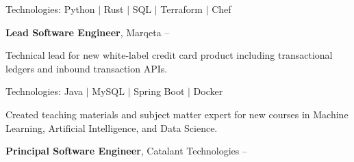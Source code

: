 \documentclass[MMMMyyyy,nonstopmode]{simpleresumecv_stacked}
\newcommand{\tech}[1]{\Gap\textrm{Technologies:} #1}
\newif\ifLOCATION
\begin{document}
\begin{Body}
\begin{Detail}
\tech{Python $|$ Rust $|$ SQL $|$ Terraform $|$ Chef}

\end{Detail}

\BigGap

\Entry
\textbf{Lead Software Engineer}, Marqeta
\hfill
 -- 

\ifLOCATION
\hfill
Rochester, New York
\fi
\Gap
\begin{Detail}
Technical lead for new white-label credit card product including transactional ledgers and inbound transaction APIs.

\iffalse
\Gap

\BulletItem
Worked closely with developers, product owners, and operations to create a new white-label credit card product. 
\fi


\tech{Java $|$ MySQL $|$ Spring Boot $|$ Docker}

\end{Detail}

\iffalse %
\BigGap

\Entry
\textbf{Consultant} - Logical Operations \textit{(Part-Time)}
\hfill
\DatestampY{2020} - \DatestampY{2022}

\ifLOCATION
\hfill 
Rochester, New York
\fi

\begin{Detail}
\BulletItem
Created teaching materials and subject matter expert for new courses in Machine Learning, Artificial Intelligence, and Data Science.
\end{Detail}
\fi %

\BigGap

\Entry
\textbf{Principal Software Engineer}, Catalant Technologies
\hfill
 -- 

\ifLOCATION
\hfill
Rochester, New York
\fi

\Gap


\end{Body}
\end{document}
